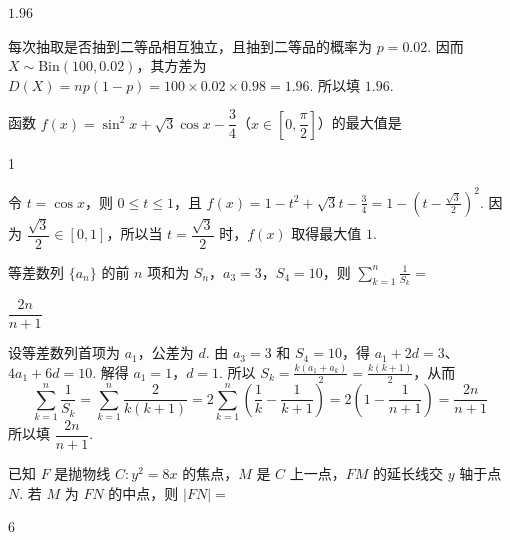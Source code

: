 \begin{answer}
\(1.96\)
\end{answer}

\begin{solution}
每次抽取是否抽到二等品相互独立，且抽到二等品的概率为 \(p=0.02\). 因而 \(X\sim\mathrm{Bin}(100,0.02)\)，其方差为
\(D(X)=np(1-p)=100\times0.02\times0.98=1.96\).
所以填 \(1.96\).
\end{solution}

\begin{problem}
函数 \(f(x)=\sin^2x+\sqrt3\cos x-\dfrac34\)（\(x\in\left[0,\dfrac{\pi}{2}\right]\)）的最大值是\fillinblank{}
\end{problem}

\begin{answer}
1
\end{answer}

\begin{solution}
令 \(t=\cos x\)，则 \(0\le t\le1\)，且
\(f(x)=1-t^2+\sqrt3t-\frac34=1-\left(t-\frac{\sqrt3}{2}\right)^2\).
因为 \(\dfrac{\sqrt3}{2}\in[0,1]\)，所以当 \(t=\dfrac{\sqrt3}{2}\) 时，\(f(x)\) 取得最大值 \(1\).
\end{solution}

\begin{problem}
等差数列 \(\{a_n\}\) 的前 \(n\) 项和为 \(S_n\)，\(a_3=3\)，\(S_4=10\)，则 \(\displaystyle \sum_{k=1}^n \frac1{S_k}=\)\fillinblank{}
\end{problem}

\begin{answer}
\(\dfrac{2n}{n+1}\)
\end{answer}

\begin{solution}
设等差数列首项为 \(a_1\)，公差为 \(d\). 由 \(a_3=3\) 和 \(S_4=10\)，得
\(a_1+2d=3\)、\(4a_1+6d=10\).
解得 \(a_1=1\)，\(d=1\). 所以
\(S_k=\frac{k(a_1+a_k)}2=\frac{k(k+1)}2\)，从而
\[
\sum_{k=1}^n\frac1{S_k}=\sum_{k=1}^n\frac{2}{k(k+1)}
=2\sum_{k=1}^n\left(\frac1k-\frac1{k+1}\right)
=2\left(1-\frac1{n+1}\right)=\frac{2n}{n+1}
\]
所以填 \(\dfrac{2n}{n+1}\).
\end{solution}

\begin{problem}
已知 \(F\) 是抛物线 \(C:y^2=8x\) 的焦点，\(M\) 是 \(C\) 上一点，\(FM\) 的延长线交 \(y\) 轴于点 \(N\). 若 \(M\) 为 \(FN\) 的中点，则 \(|FN|=\)\fillinblank{}
\end{problem}

\begin{answer}
\(6\)
\end{answer}

